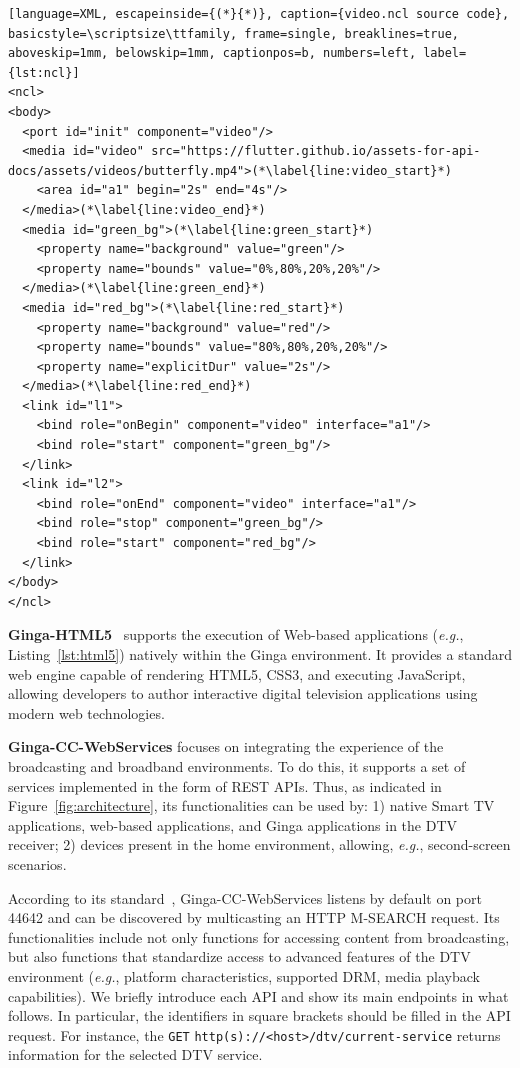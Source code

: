 \documentclass[sigconf,authorversion,review,authordraft]{webmedia}
\begin{document}
\newpage

\begin{lstlisting}[language=XML, escapeinside={(*}{*)}, caption={video.ncl source code}, basicstyle=\scriptsize\ttfamily, frame=single, breaklines=true, aboveskip=1mm, belowskip=1mm, captionpos=b, numbers=left, label={lst:ncl}]
<ncl>
<body>
  <port id="init" component="video"/>
  <media id="video" src="https://flutter.github.io/assets-for-api-docs/assets/videos/butterfly.mp4">(*\label{line:video_start}*)
    <area id="a1" begin="2s" end="4s"/>
  </media>(*\label{line:video_end}*)
  <media id="green_bg">(*\label{line:green_start}*)
    <property name="background" value="green"/>
    <property name="bounds" value="0%,80%,20%,20%"/>
  </media>(*\label{line:green_end}*)
  <media id="red_bg">(*\label{line:red_start}*)
    <property name="background" value="red"/>
    <property name="bounds" value="80%,80%,20%,20%"/>
    <property name="explicitDur" value="2s"/>
  </media>(*\label{line:red_end}*)
  <link id="l1">
    <bind role="onBegin" component="video" interface="a1"/>
    <bind role="start" component="green_bg"/>
  </link>
  <link id="l2">
    <bind role="onEnd" component="video" interface="a1"/>
    <bind role="stop" component="green_bg"/>
    <bind role="start" component="red_bg"/>
  </link>
</body>
</ncl>
\end{lstlisting}

\textbf{Ginga-HTML5}~\cite{abnt_15606_10_2026} supports the execution of Web-based applications (\textit{e.g.}, Listing~\ref{lst:html5}) natively within the Ginga environment. It provides a standard web engine capable of rendering HTML5, CSS3, and executing JavaScript, allowing developers to author interactive digital television applications using modern web technologies.

\textbf{Ginga-CC-WebServices} focuses on integrating the experience of the broadcasting and broadband environments.
To do this, it supports a set of services implemented in the form of REST APIs.
Thus, as indicated in Figure~\ref{fig:architecture}, its functionalities can be used by:
1) native Smart TV applications, web-based applications, and Ginga applications in the DTV receiver;
2) devices present in the home environment, allowing, \textit{e.g.}, second-screen scenarios.

According to its standard~\cite{abnt_15606_11}, Ginga-CC-WebServices listens by default on port 44642 and can be discovered by multicasting an HTTP M-SEARCH request.
Its functionalities include not only functions for accessing content from broadcasting, but also functions that standardize access to advanced features of the DTV environment (\textit{e.g.},  platform characteristics, supported DRM, media playback capabilities).
We briefly introduce each API and show its main endpoints in what follows.
In particular, the identifiers in square brackets should be filled in the API request. For instance, the \texttt{GET} \texttt{http(s)://\textless{}host\textgreater{}/dtv/current-service} returns information for the selected DTV service.
\end{document}
